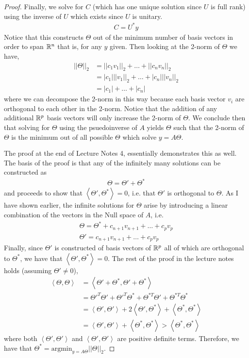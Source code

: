 \documentclass{article}
\begin{document}
\begin{proof}
    Finally, we solve for $C$ (which has one unique solution since $U$ is full
    rank) using the inverse of $U$ which exists since $U$ is
    unitary. 
    \begin{gather*}
        C = U^*y
    \end{gather*}
    Notice that this constructs $\Theta$ out of the minimum number of basis
    vectors in order to span $\mathbb{R}^{n}$ that is, for any $y$ given. Then looking at
    the 2-norm of $\Theta$ we have, 
    \begin{align*}
        ||\Theta||_2 &= ||c_1v_1||_2 + \ldots + ||c_nv_n||_2\\
         &= |c_1|||v_1||_2 + \ldots + |c_n|||v_n||_2\\
         &= |c_1| + \ldots + |c_n|
    \end{align*}
    where we can decompose the 2-norm in this way because each basis vector
    $v_i$ are orthogonal to each other in the 2-norm. Notice that the addition
    of any additional $\mathbb{R}^{p}$ basis vectors will only increase the 2-norm of
    $\Theta$. We conclude then that solving for $\Theta$ using the psuedoinverse
    of $A$ yields $\Theta$ such that the 2-norm of $\Theta$ is the minimum out
    of all possible $\Theta$ which solve $y=A\Theta$. 

    The proof at the end of Lecture Notes 4, essentially demonstrates this as
    well. The basis of the proof is that any of the infinitely many solutions
    can be constructed as
    \begin{gather*}
        \Theta = \Theta' + \Theta^*
    \end{gather*}
    and proceeds to show that $\left<\Theta', \Theta^*\right> = 0$, i.e. that
    $\Theta'$ is orthogonal to $\Theta$. As I have shown earlier, the infinite
    solutions for $\Theta$ arise by introducing a linear combination of the
    vectors in the Null space of $A$, i.e.
    \begin{gather*}
        \Theta = \Theta^* + c_{n+1}v_{n+1} + \ldots + c_pv_p\\
        \Theta' = c_{n+1}v_{n+1} + \ldots + c_pv_p
    \end{gather*}
    Finally, since $\Theta'$ is constructed of basis vectors of $\mathbb{R}^p$ all of
    which are orthogonal to $\Theta^*$, we have that
    $\left<\Theta',\Theta^*\right> = 0$. The rest of the proof in the lecture
    notes holds (assuming $\Theta' \ne 0$), 
    \begin{align*}
        \left<\Theta, \Theta\right> &=
        \left<\Theta'+\Theta^*,\Theta'+\Theta^*\right>\\
        &= \Theta'^T\Theta' + \Theta'^T\Theta^* + \Theta^{*T}\Theta' +
        \Theta^{*T}\Theta^*\\
        &= \left<\Theta',\Theta'\right> + 2\left<\Theta',\Theta^*\right> +
        \left<\Theta^*, \Theta^*\right>\\
        &= \left<\Theta',\Theta'\right> + \left<\Theta^*,\Theta^*\right> > \left<\Theta^*,\Theta^*\right>
    \end{align*}
    where both $\left<\Theta', \Theta'\right>$ and $\left<\Theta',
    \Theta'\right>$ are positive definite terms. Therefore, we have that
    $\Theta^* = \text{argmin}_{y=A\Theta}||\Theta||_2$. 


\end{proof}
\end{document}

